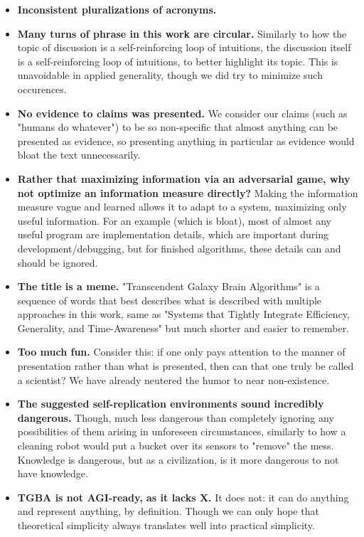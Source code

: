 \documentclass{article}
\begin{document}
\begin{itemize}
\item \textbf{Inconsistent pluralizations of acronyms.}
\item \textbf{Many turns of phrase in this work are circular.} Similarly to how the topic of discussion is a self-reinforcing loop of intuitions, the discussion itself is a self-reinforcing loop of intuitions, to better highlight its topic. This is unavoidable in applied generality, though we did try to minimize such occurences.
\item \textbf{No evidence to claims was presented.} We consider our claims (such as "humans do whatever") to be so non-specific that almost anything can be presented as evidence, so presenting anything in particular as evidence would bloat the text unnecessarily.
\item \textbf{Rather that maximizing information via an adversarial game, why not optimize an information measure directly?} Making the information measure vague and learned allows it to adapt to a system, maximizing only useful information. For an example (which is bloat), most of almost any useful program are implementation details, which are important during development/debugging, but for finished algorithms, these details can and should be ignored.
\item \textbf{The title is a meme.} "Transcendent Galaxy Brain Algorithms" is a sequence of words that best describes what is described with multiple approaches in this work, same as "Systems that Tightly Integrate Efficiency, Generality, and Time-Awareness" but much shorter and easier to remember.
\item \textbf{Too much fun.} Consider this: if one only pays attention to the manner of presentation rather than what is presented, then can that one truly be called a scientist? We have already neutered the humor to near non-existence.
\item \textbf{The suggested self-replication environments sound incredibly dangerous.} Though, much less dangerous than completely ignoring any possibilities of them arising in unforeseen circumstances, similarly to how a cleaning robot would put a bucket over its sensors to "remove" the mess. Knowledge is dangerous, but as a civilization, is it more dangerous to not have knowledge.
\item \textbf{TGBA is not AGI-ready, as it lacks X.} It does not: it can do anything and represent anything, by definition. Though we can only hope that theoretical simplicity always translates well into practical simplicity.

\end{itemize}
\end{document}
